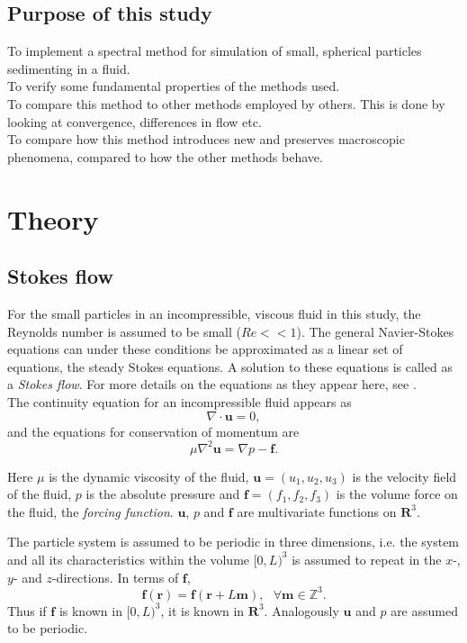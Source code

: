 \documentclass[a4paper,
twoside=false,abstract=false,numbers=noenddot,
titlepage=false,headings=small,parskip=half,version=last]{scrartcl}
\begin{document}
\subsection{Purpose of this study}
To implement a spectral method for simulation of small, spherical particles sedimenting in a fluid.\\
To verify some fundamental properties of the methods used.\\
To compare this method to other methods employed by others. This is done by looking at convergence, differences in flow etc.\\
To compare how this method introduces new and preserves macroscopic phenomena, compared to how the other methods behave.

\section{Theory}
\subsection{Stokes flow}
For the small particles in an incompressible, viscous fluid in this study, the Reynolds number is assumed to be small ($Re<<1$). The general Navier-Stokes equations can under these conditions be approximated as a linear set of equations, the steady Stokes equations. A solution to these equations is called as a \emph{Stokes flow}. For more details on the equations as they appear here, see \cite{guazzellibook}.\\
The continuity equation for an incompressible fluid appears as
\begin{equation}
\nabla \cdot \mathbf{u} = 0, \label{eq:incompressible}
\end{equation}
and the equations for conservation of momentum are
\begin{equation}
\mu \nabla^2 \mathbf{u} = \nabla p - \mathbf{f}. \label{eq:stokesequations}
\end{equation}

Here $\mu$ is the dynamic viscosity of the fluid, $\mathbf{u}=(u_1,u_2,u_3)$ is the velocity field of the fluid, $p$ is the absolute pressure and $\mathbf{f}=(f_1,f_2,f_3)$ is the volume force on the fluid, the \emph{forcing function}. $\mathbf{u}$, $p$ and $\mathbf{f}$ are multivariate functions on $\mathbf{R}^3$.

The particle system is assumed to be periodic in three dimensions, i.e. the system and all its characteristics within the volume $[0,L)^3$ is assumed to repeat in the $x$-,$y$- and $z$-directions.
In terms of $\mathbf{f}$,
\begin{equation}
\mathbf{f}(\mathbf{r}) = \mathbf{f}(\mathbf{r}+L\mathbf{m}),\text{ }\forall \mathbf{m} \in \mathbb{Z}^3.
\end{equation}
Thus if $\mathbf{f}$ is known in $[0,L)^3$, it is known in $\mathbf{R}^3$. Analogously $\mathbf{u}$ and $p$ are assumed to be periodic.
\end{document}
